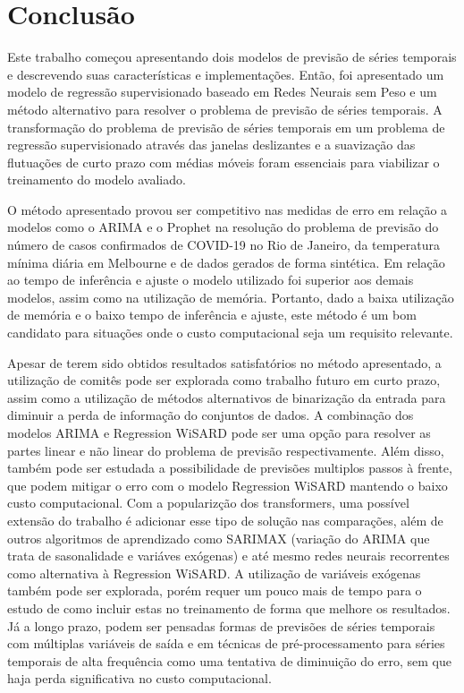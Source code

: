 \chapter{Conclusão}
\label{chap:06}

Este trabalho começou apresentando dois modelos de previsão de séries temporais e descrevendo suas características e implementações. Então, foi apresentado um modelo de regressão supervisionado baseado em Redes Neurais sem Peso e um método alternativo para resolver o problema de previsão de séries temporais. A transformação do problema de previsão de séries temporais em um problema de regressão supervisionado através das janelas deslizantes e a suavização das flutuações de curto prazo com médias móveis foram essenciais para viabilizar o treinamento do modelo avaliado.

O método apresentado provou ser competitivo nas medidas de erro em relação a modelos como o ARIMA e o Prophet na resolução do problema de previsão do número de casos confirmados de COVID-19 no Rio de Janeiro, da temperatura mínima diária em Melbourne e de dados gerados de forma sintética. Em relação ao tempo de inferência e ajuste o modelo utilizado foi superior aos demais modelos, assim como na utilização de memória. Portanto, dado a baixa utilização de memória e o baixo tempo de inferência e ajuste, este método é um bom candidato para situações onde o custo computacional seja um requisito relevante.

Apesar de terem sido obtidos resultados satisfatórios no método apresentado, a utilização de comitês pode ser explorada como trabalho futuro em curto prazo, assim como a utilização de métodos alternativos de binarização da entrada para diminuir a perda de informação do conjuntos de dados. A combinação dos modelos ARIMA e Regression WiSARD pode ser uma opção para resolver as partes linear e não linear do problema de previsão respectivamente. Além disso, também pode ser estudada a possibilidade de previsões multiplos passos à frente, que podem mitigar o erro com o modelo Regression WiSARD mantendo o baixo custo computacional. Com a popularizção dos transformers, uma possível extensão do trabalho é adicionar esse tipo de solução nas comparações, além de outros algoritmos de aprendizado como SARIMAX (variação do ARIMA que trata de sasonalidade e variáves exógenas) e até mesmo redes neurais recorrentes como alternativa à Regression WiSARD. A utilização de variáveis exógenas também pode ser explorada, porém requer um pouco mais de tempo para o estudo de como incluir estas no treinamento de forma que melhore os resultados. Já a longo prazo, podem ser pensadas formas de previsões de séries temporais com múltiplas variáveis de saída e em técnicas de pré-processamento para séries temporais de alta frequência como uma tentativa de diminuição do erro, sem que haja perda significativa no custo computacional.
